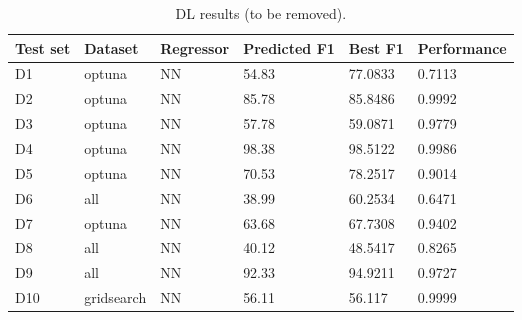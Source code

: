 \begin{table}[ht!]
\caption{DL results (to be removed).}
\label{tab:dl-results}
\begin{tabular}{|p{0.5cm}|l|p{1.2cm}|p{1.2cm}|p{1cm}|l|}
\hline
\textbf{Test set} & \textbf{Dataset} & \textbf{Regressor} & \textbf{Predicted F1} & \textbf{Best F1} & \textbf{Performance} \\
\hline
D1 & optuna & NN & 54.83 & 77.0833 & 0.7113 \\
D2 & optuna & NN & 85.78 & 85.8486 & 0.9992 \\
D3 & optuna & NN & 57.78 & 59.0871 & 0.9779 \\
D4 & optuna & NN & 98.38 & 98.5122 & 0.9986 \\
D5 & optuna & NN & 70.53 & 78.2517 & 0.9014 \\
D6 & all & NN & 38.99 & 60.2534 & 0.6471 \\
D7 & optuna & NN & 63.68 & 67.7308 & 0.9402 \\
D8 & all & NN & 40.12 & 48.5417 & 0.8265 \\
D9 & all & NN & 92.33 & 94.9211 & 0.9727 \\
D10 & gridsearch & NN & 56.11 & 56.117 & 0.9999 \\
\bottomrule
\end{tabular}
\end{table}